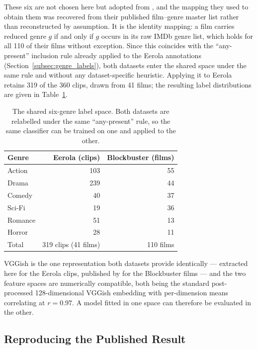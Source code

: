 These six are not chosen here but adopted from \citet{ma2021computational}, and the
mapping they used to obtain them was recovered from their published film--genre master
list rather than reconstructed by assumption. It is the identity mapping: a film carries
reduced genre $g$ if and only if $g$ occurs in its raw IMDb genre list, which holds for
all 110 of their films without exception. Since this coincides with the ``any-present''
inclusion rule already applied to the Eerola annotations
(Section~\ref{subsec:genre_labels}), both datasets enter the shared space under the same
rule and without any dataset-specific heuristic. Applying it to Eerola retains 319 of the
360 clips, drawn from 41 films; the resulting label distributions are given in
Table~\ref{tab:shared_space}.

\begin{table}[t]
  \centering
  \caption{The shared six-genre label space. Both datasets are relabelled under the same
    ``any-present'' rule, so the same classifier can be trained on one and applied to the
    other.}
  \label{tab:shared_space}
  \begin{tabular}{lrr}
    \hline
    Genre   & Eerola (clips) & Blockbuster (films) \\
    \hline
    Action  & 103 & 55 \\
    Drama   & 239 & 44 \\
    Comedy  &  40 & 37 \\
    Sci-Fi  &  19 & 36 \\
    Romance &  51 & 13 \\
    Horror  &  28 & 11 \\
    \hline
    Total   & 319 clips (41 films) & 110 films \\
    \hline
  \end{tabular}
\end{table}

VGGish is the one representation both datasets provide identically --- extracted here for
the Eerola clips, published by \citeauthor{ma2021computational} for the Blockbuster films
--- and the two feature spaces are numerically compatible, both being the standard
post-processed 128-dimensional VGGish embedding with per-dimension means correlating at
$r=0.97$. A model fitted in one space can therefore be evaluated in the other.

\subsection{Reproducing the Published Result}

